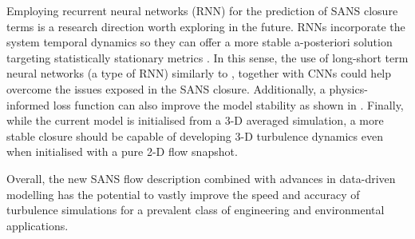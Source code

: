 \documentclass[../main.tex]{subfiles}
\begin{document}
Employing recurrent neural networks (RNN) for the prediction of SANS closure terms is a research direction worth exploring in the future.
RNNs incorporate the system temporal dynamics so they can offer a more stable a-posteriori solution targeting statistically stationary metrics \citep{Vlachas2018, Kim2020b}.
In this sense, the use of long-short term neural networks (a type of RNN) similarly to \cite{Vlachas2018}, together with CNNs could help overcome the issues exposed in the SANS closure.
Additionally, a physics-informed loss function can also improve the model stability as shown in \cite{Lee2019}.
Finally, while the current model is initialised from a 3-D averaged simulation, a more stable closure should be capable of developing 3-D turbulence dynamics even when initialised with a pure 2-D flow snapshot.

Overall, the new SANS flow description combined with advances in data-driven modelling has the potential to vastly improve the speed and accuracy of turbulence simulations for a prevalent class of engineering and environmental applications.
\end{document}
